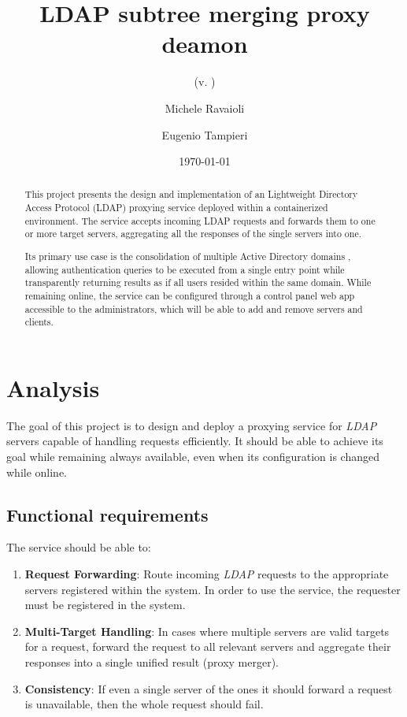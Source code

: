 \documentclass{scrartcl}
\title{\LARGE
    LDAP subtree merging proxy deamon
}
\subtitle{(v. \version)}
\author{
    Michele Ravaioli \\ \emailaddr{michele.ravaioli3@studio.unibo.it}
    \and 
    Eugenio Tampieri \\ \emailaddr{eugenio.tampieri@studio.unibo.it} 
}
\date{\today}
\begin{document}
\maketitle

\begin{abstract}
    \par This project presents the design and implementation of an Lightweight Directory Access Protocol (LDAP)
	\cite{rfc4511} proxying service deployed within a containerized environment. The service accepts incoming LDAP
	requests and forwards them to one or more target servers, aggregating all the responses of the single servers
	into one.
	\par Its primary use case is the consolidation of multiple Active Directory domains \cite{ad}, allowing authentication queries to be executed from a single entry point while transparently returning results as if all users resided within the same domain. While remaining online, the service can be configured through a control panel web app accessible to the administrators, which will be able to add and remove servers and clients.
\end{abstract}

\section{Analysis}

\par The goal of this project is to design and deploy a proxying service for \textit{LDAP} servers capable of handling requests efficiently. It should be able to achieve its goal while remaining always available, even when its configuration is changed while online.

\subsection{Functional requirements}

\par The service should be able to:

\begin{enumerate}
    \item \textbf{Request Forwarding}: Route incoming \textit{LDAP} requests to the appropriate servers registered within the system. In order to use the service, the requester must be registered in the system.
    \item \textbf{Multi-Target Handling}: In cases where multiple servers are valid targets for a request, forward the request to all relevant servers and aggregate their responses into a single unified result (proxy merger).
    \item \textbf{Consistency}: If even a single server of the ones it should forward a request is unavailable, then the whole request should fail.
\end{enumerate}
\end{document}
